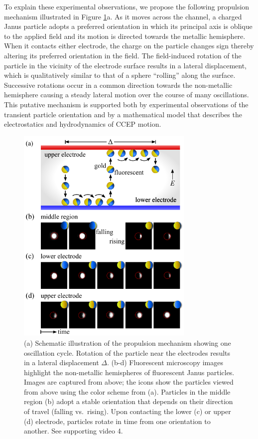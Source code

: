 To explain these experimental observations, we propose the following propulsion mechanism illustrated in Figure \ref{fig:3}a. 
As it moves across the channel, a charged Janus particle adopts a preferred orientation in which its principal axis is oblique to the applied field and its motion is directed towards the metallic hemisphere.
When it contacts either electrode, the charge on the particle changes sign thereby altering its preferred orientation in the field.
The field-induced rotation of the particle in the vicinity of the electrode surface results in a lateral displacement, which is qualitatively similar to that of a sphere ``rolling'' along the surface.
Successive rotations occur in a common direction towards the non-metallic hemisphere causing a steady lateral motion over the course of many oscillations.
This putative mechanism is supported both by experimental observations of the transient particle orientation and by a mathematical model that describes the electrostatics and hydrodynamics of CCEP motion.

\begin{figure}[p]
\centering
\includegraphics[width=8.5cm]{figures/2_3.pdf}
\caption{(a) Schematic illustration of the propulsion mechanism showing one oscillation cycle.  Rotation of the particle near the electrodes results in a lateral displacement $\Delta$. (b-d) Fluorescent microscopy images highlight the non-metallic hemispheres of fluorescent Janus particles. Images are captured from above; the icons show the particles viewed from above using the color scheme from (a). Particles in the middle region (b) adopt a stable orientation that depends on their direction of travel (falling vs.~rising). Upon contacting the lower (c) or upper (d) electrode, particles rotate in time from one orientation to another. See supporting video 4.}
\label{fig:3}
\end{figure}

